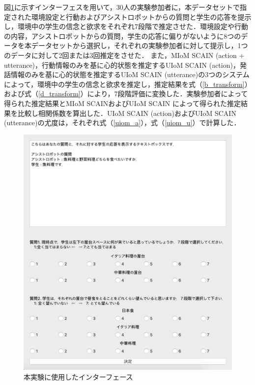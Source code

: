 \par
図\ref{fig:interface}に示すインターフェスを用いて，30人の実験参加者に，本データセットで指定された環境設定と行動およびアシストロボットからの質問と学生の応答を提示し，環境中の学生の信念と欲求をそれぞれ7段階で推定させた．環境設定や行動の内容，アシストロボットからの質問，学生の応答に偏りがないように8つのデータを本データセットから選択し，それぞれの実験参加者に対して提示し，1つのデータに対して2回または3回推定をさせた．
また，MIoM SCAIN (action + utterance)，行動情報のみを基に心的状態を推定するUIoM SCAIN (action)，発話情報のみを基に心的状態を推定するUIoM SCAIN (utterance)の3つのシステムによって，環境中の学生の信念と欲求を推定し，推定結果を式（\ref{b_transform}）および式（\ref{d_transform}）により，7段階評価に変換した．実験参加者によって得られた推定結果とMIoM SCAINおよびUIoM SCAIN によって得られた推定結果を比較し相関係数を算出した．UIoM SCAIN (action)およびUIoM SCAIN (utterance)の尤度は，それぞれ式（\ref{uiom_a}），式（\ref{uiom_u}）で計算した．
\begin{figure}[htbp]
  \begin{center}
    \includegraphics[scale=0.6]{./interface.pdf}
    \caption{本実験に使用したインターフェース}
    \label{fig:interface}
  \end{center}
\end{figure}


